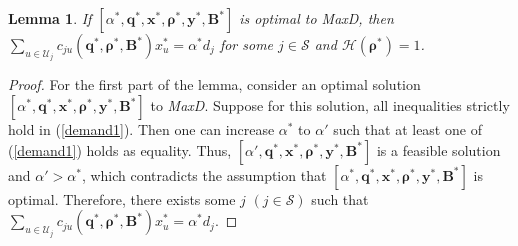 \documentclass[10pt,journal,final,finalsubmission,twocolumn]{IEEEtran}
\newtheorem{lemma}[theorem]{Lemma}
\begin{document}
\begin{lemma}\label{property 1}
If $[\alpha ^*, \boldsymbol{q}^*,\boldsymbol{x}^*,\boldsymbol{\rho}^*, \boldsymbol{y}^*, \boldsymbol{B}^*]$ is optimal to MaxD, then $\sum_{u\in \mathcal{U}_j} c_{ju}\left (\boldsymbol{q}^*,\boldsymbol{ \rho}^*, \boldsymbol{B}^*\right )x_u^*= \alpha^* d_j$ for some $j\in \mathcal{S}$ and $\mathcal{H}(\boldsymbol{\rho^*}) = 1$.
\end{lemma}
\begin{proof} 
For the first part of the lemma, consider an optimal solution $[\alpha ^*, \boldsymbol{q}^*,\boldsymbol{x}^*,\boldsymbol{\rho}^*, \boldsymbol{y}^*, \boldsymbol{B}^*]$ to {\em MaxD}. Suppose for this solution, all inequalities strictly hold in (\ref{demand1}). Then one can increase $\alpha^*$ to $\alpha'$ such that at least one of (\ref{demand1}) holds as equality.  Thus, $[\alpha', \boldsymbol{q}^*,\boldsymbol{x}^*,\boldsymbol{\rho}^*, \boldsymbol{y}^*,\boldsymbol{B}^*]$ is a feasible solution and $\alpha'>\alpha^*$, which contradicts the assumption that $[\alpha^*, \boldsymbol{q}^*,\boldsymbol{x}^*,\boldsymbol{\rho}^*, \boldsymbol{y}^*,\boldsymbol{B}^*]$ is optimal. Therefore, there exists some $j$ $(j\in \mathcal{S})$ such that $\sum_{u\in \mathcal{U}_j} c_{ju}\left (\boldsymbol{q}^*,\boldsymbol{ \rho}^*, \boldsymbol{B}^*\right )x_u^*= \alpha^* d_j$.


\end{proof}
\end{document}
